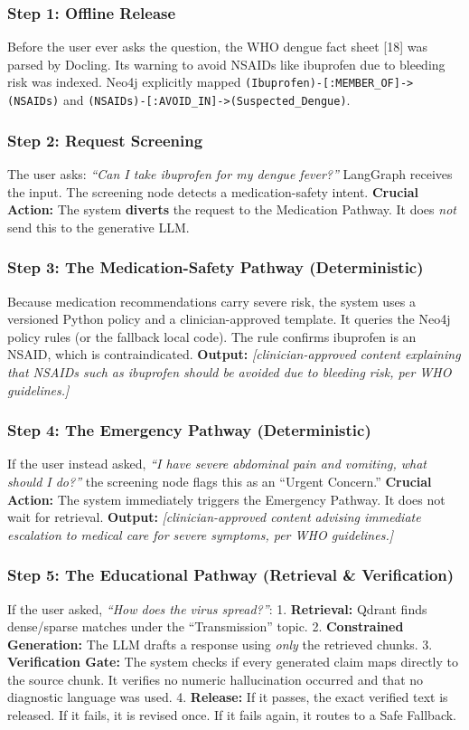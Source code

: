 \documentclass[11pt,a4paper]{article}
\begin{document}
\subsubsection{Step 1: Offline Release}
Before the user ever asks the question, the WHO dengue fact sheet [18] was parsed by Docling. Its warning to avoid NSAIDs like ibuprofen due to bleeding risk was indexed. Neo4j explicitly mapped \texttt{(Ibuprofen)-[:MEMBER\_OF]->(NSAIDs)} and \newline\texttt{(NSAIDs)-[:AVOID\_IN]->(Suspected\_Dengue)}.

\subsubsection{Step 2: Request Screening}
The user asks: \textit{``Can I take ibuprofen for my dengue fever?''}
LangGraph receives the input. The screening node detects a medication-safety intent. 
\textbf{Crucial Action:} The system \textbf{diverts} the request to the Medication Pathway. It does \emph{not} send this to the generative LLM.

\subsubsection{Step 3: The Medication-Safety Pathway (Deterministic)}
Because medication recommendations carry severe risk, the system uses a versioned Python policy and a clinician-approved template.
It queries the Neo4j policy rules (or the fallback local code). The rule confirms ibuprofen is an NSAID, which is contraindicated.
\textbf{Output:} \textit{[clinician-approved content explaining that NSAIDs such as ibuprofen should be avoided due to bleeding risk, per WHO guidelines.]}

\subsubsection{Step 4: The Emergency Pathway (Deterministic)}
If the user instead asked, \textit{``I have severe abdominal pain and vomiting, what should I do?''} the screening node flags this as an ``Urgent Concern.''
\textbf{Crucial Action:} The system immediately triggers the Emergency Pathway. It does not wait for retrieval.
\textbf{Output:} \textit{[clinician-approved content advising immediate escalation to medical care for severe symptoms, per WHO guidelines.]}

\subsubsection{Step 5: The Educational Pathway (Retrieval \& Verification)}
If the user asked, \textit{``How does the virus spread?''}:
1. \textbf{Retrieval:} Qdrant finds dense/sparse matches under the ``Transmission'' topic.
2. \textbf{Constrained Generation:} The LLM drafts a response using \emph{only} the retrieved chunks.
3. \textbf{Verification Gate:} The system checks if every generated claim maps directly to the source chunk. It verifies no numeric hallucination occurred and that no diagnostic language was used.
4. \textbf{Release:} If it passes, the exact verified text is released. If it fails, it is revised once. If it fails again, it routes to a Safe Fallback.
\end{document}
